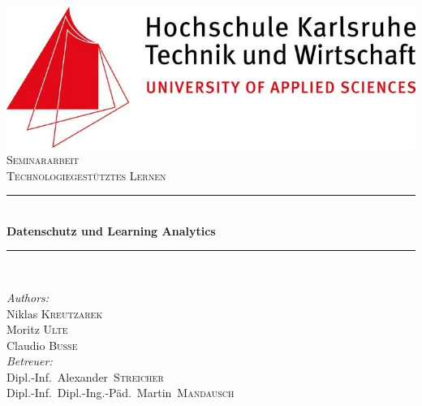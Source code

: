 \documentclass[a4paper, 12pt]{article}
\begin{document}
\begin{titlepage}

\newcommand{\HRule}{\rule{\linewidth}{0.4mm}} %

\center %
 

\includegraphics[scale=0.5]{images/hska_logo.jpg}\\[2.5cm] %
\textsc{\Large Seminararbeit}\\[0.5cm] %
\Large \textsc{Technologiegestütztes Lernen}

\HRule \\[0.4cm]
{ \huge \bfseries Datenschutz und Learning Analytics}\\[0.4cm] %
\HRule \\[1.5cm]
 

\begin{minipage}{0.4\textwidth}
\begin{flushleft} \large
\emph{Authors:}\\
Niklas \textsc{Kreutzarek}\\ Moritz \textsc{Ulte} \\Claudio \textsc{Busse}\\ %
\emph{Betreuer:}\\
\mbox{Dipl.-Inf. Alexander \textsc{Streicher}} \\
\mbox{Dipl.-Inf. Dipl.-Ing.-Päd. Martin \textsc{Mandausch}} 



\end{flushleft}
\end{minipage}
\end{titlepage}
\end{document}
